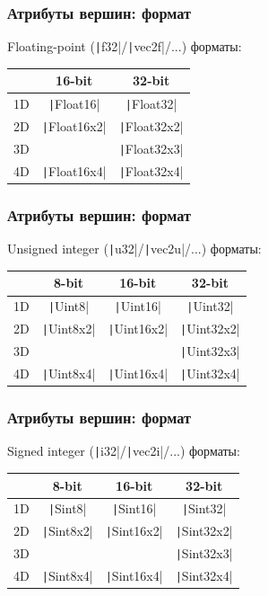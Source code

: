\documentclass[10pt]{beamer}
\begin{document}
\begin{frame}[fragile]
\frametitle{Атрибуты вершин: формат}
Floating-point (\texttt|f32|/\texttt|vec2f|/...) форматы:
\begin{center}
\begin{tabular}{ |c|c|c| } 
\hline
 & 16-bit & 32-bit \\ 
\hline
1D & \texttt|Float16| & \texttt|Float32| \\ 
\hline
2D & \texttt|Float16x2| & \texttt|Float32x2| \\ 
\hline
3D & & \texttt|Float32x3| \\ 
\hline
4D & \texttt|Float16x4| & \texttt|Float32x4| \\ 
\hline
\end{tabular}
\end{center}
\end{frame}

\begin{frame}[fragile]
\frametitle{Атрибуты вершин: формат}
Unsigned integer (\texttt|u32|/\texttt|vec2u|/...) форматы:
\begin{center}
\begin{tabular}{ |c|c|c|c| } 
\hline
 & 8-bit & 16-bit & 32-bit \\ 
\hline
1D & \texttt|Uint8| & \texttt|Uint16| & \texttt|Uint32| \\ 
\hline
2D & \texttt|Uint8x2| & \texttt|Uint16x2| & \texttt|Uint32x2| \\ 
\hline
3D & & & \texttt|Uint32x3| \\ 
\hline
4D & \texttt|Uint8x4| & \texttt|Uint16x4| & \texttt|Uint32x4| \\ 
\hline
\end{tabular}
\end{center}
\end{frame}

\begin{frame}[fragile]
\frametitle{Атрибуты вершин: формат}
Signed integer (\texttt|i32|/\texttt|vec2i|/...) форматы:
\begin{center}
\begin{tabular}{ |c|c|c|c| } 
\hline
 & 8-bit & 16-bit & 32-bit \\ 
\hline
1D & \texttt|Sint8| & \texttt|Sint16| & \texttt|Sint32| \\ 
\hline
2D & \texttt|Sint8x2| & \texttt|Sint16x2| & \texttt|Sint32x2| \\ 
\hline
3D & & & \texttt|Sint32x3| \\ 
\hline
4D & \texttt|Sint8x4| & \texttt|Sint16x4| & \texttt|Sint32x4| \\ 
\hline
\end{tabular}
\end{center}
\end{frame}
\end{document}
